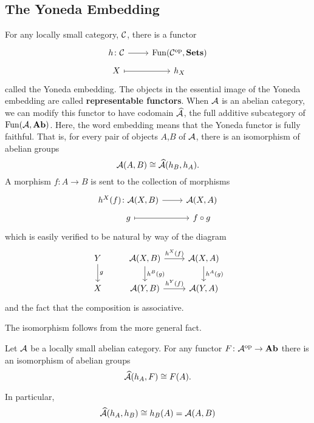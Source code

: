 \documentclass[reqno, 12pt]{amsart}
\begin{document}
\subsection{The Yoneda Embedding}
For any locally small category, $\mathcal{C}$, there is a functor
$$\begin{tikzcd}[row sep=tiny]
  h \colon \C \arrow{r} & \Fun(\C^\opp, \op{{\bf Sets}})\\
  X \arrow[mapsto]{r} & h_X
\end{tikzcd}$$
called the Yoneda embedding.
The objects in the essential image of the Yoneda embedding are called \textbf{representable functors}.
When $\mathcal{A}$ is an abelian category, we can modify this functor to have codomain $\widehat{\mathcal{A}}$, the full additive subcategory of $\operatorname{Fun}(\mathcal{A},\operatorname{\bf Ab})$.
Here, the word embedding means that the Yoneda functor is fully faithful.
That is, for every pair of objects $A$,$B$ of $\mathcal{A}$, there is an isomorphism of abelian groups
$$\mathcal{A}(A,B) \cong \widehat{\mathcal{A}}(h_B, h_A).$$
A morphism $f \colon A \to B$ is sent to the collection of morphisms
$$\begin{tikzcd}[row sep=tiny]
  h^X(f) \colon \A(X,B) \arrow{r} & \A(X,A)\\
  g \arrow[mapsto]{r} & f \circ g
\end{tikzcd}$$
which is easily verified to be natural by way of the diagram
$$\begin{tikzcd}
  Y\arrow{d}{g} & \A(X,B) \arrow{d}{h^B(g)}\arrow{r}{h^X(f)} & \A(X,A)\arrow{d}{h^A(g)}\\
  X & \A(Y,B) \arrow{r}{h^Y(f)} & \A(Y,A)
\end{tikzcd}$$
and the fact that the composition is associative.

The isomorphism follows from the more general fact.
\begin{proposition}
  Let $\mathcal{A}$ be a locally small abelian category.
  For any functor $F \colon \mathcal{A}^{\operatorname{op}} \to \operatorname{\bf Ab}$ there is an isomorphism of abelian groups
  $$\widehat{\mathcal{A}}(h_A, F) \cong F(A).$$

  In particular,
  $$\widehat{\mathcal{A}}(h_A, h_B) \cong h_B(A) = \mathcal{A}(A,B)$$
\end{proposition}
\end{document}
